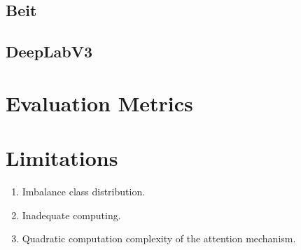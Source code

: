 \subsection{Beit}

\subsection{DeepLabV3}
\section{Evaluation Metrics}
\section{Limitations}
\begin{enumerate}
    \item Imbalance class distribution.
    \item Inadequate computing.
    \item Quadratic computation complexity of the attention mechanism.
\end{enumerate}
